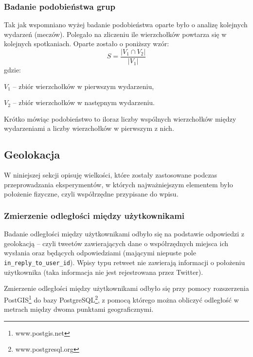 \subsubsection{Badanie podobieństwa grup}
\label{subsection:badaniepodobienstwagrup}
Tak jak wspomniano wyżej badanie podobieństwa oparte było o analizę kolejnych
wydarzeń (meczów).
Polegało na zliczeniu ile wierzchołków powtarza się w kolejnych spotkaniach.
Oparte zostało o poniższy wzór:
\begin{equation}
S = \frac{|V_1 \cap V_2|}{|V_1|}
\end{equation}  
gdzie:

$V_1$ -- zbiór wierzchołków w pierwszym wydarzeniu,

$V_2$ -- zbiór wierzchołków w następnym wydarzeniu.

Krótko mówiąc podobieństwo to iloraz liczby wspólnych wierzchołków między 
wydarzeniami a liczby wierzchołków w pierwszym z nich.







\subsection{Geolokacja}
W niniejszej sekcji opisuję wielkości, które zostały zastosowane podczas
przeprowadzania eksperymentów, w których najważniejszym elementem było położenie
fizyczne, czyli współrzędne przypisane do wpisu.

\subsubsection{Zmierzenie odległości między użytkownikami}
\label{subsubsection:zmierzenieodleglosci}


Badanie odległości między użytkownikami odbyło się na podstawie odpowiedzi z
geolokacją -- czyli tweetów zawierających dane o współrzędnych miejsca ich
wysłania oraz będących odpowiedziami (mającymi niepuste pole
\texttt{in\_reply\_to\_user\_id}). Wpisy typu retweet nie zawierają informacji
o położeniu użytkownika (taka informacja nie jest rejestrowana przez Twitter).

Zmierzenie odległości między użytkownikami odbyło się przy pomocy rozszerzenia
PostGIS\footnote{www.postgis.net} do bazy
PostgreSQL\footnote{www.postgresql.org}, z pomocą którego można obliczyć
odległość w metrach między dwoma punktami geograficznymi.

